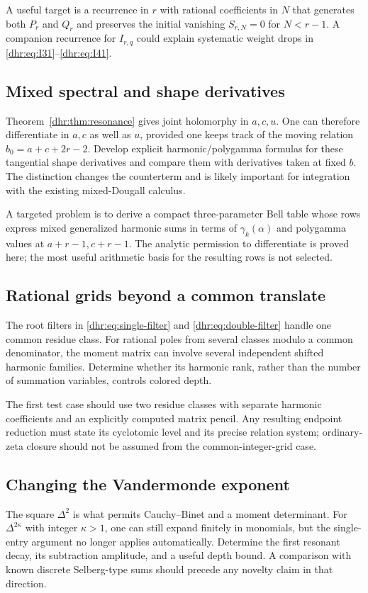 A useful target is a recurrence in $r$ with rational coefficients in
$N$ that generates both $P_r$ and $Q_r$ and preserves the initial
vanishing $S_{r,N}=0$ for $N<r-1$. A companion recurrence for
$I_{r,q}$ could explain systematic weight drops in
\eqref{dhr:eq:I31}--\eqref{dhr:eq:I41}.

\subsection{Mixed spectral and shape derivatives}
Theorem~\ref{dhr:thm:resonance} gives joint holomorphy in $a,c,u$.
One can therefore differentiate in $a,c$ as well as $u$, provided
one keeps track of the moving relation $b_0=a+c+2r-2$.
Develop explicit harmonic/polygamma formulas for these tangential
shape derivatives and compare them with derivatives taken at fixed
$b$. The distinction changes the counterterm and is likely important
for integration with the existing mixed-Dougall calculus.

A targeted problem is to derive a compact three-parameter Bell table
whose rows express mixed generalized harmonic sums in terms of
$\gamma_k(\alpha)$ and polygamma values at $a+r-1,c+r-1$.
The analytic permission to differentiate is proved here; the most
useful arithmetic basis for the resulting rows is not selected.

\subsection{Rational grids beyond a common translate}
The root filters in \eqref{dhr:eq:single-filter} and
\eqref{dhr:eq:double-filter} handle one common residue class.
For rational poles from several classes modulo a common denominator,
the moment matrix can involve several independent shifted harmonic
families. Determine whether its harmonic rank, rather than the number
of summation variables, controls colored depth.

The first test case should use two residue classes with separate
harmonic coefficients and an explicitly computed matrix pencil.
Any resulting endpoint reduction must state its cyclotomic level and
its precise relation system; ordinary-zeta closure should not be
assumed from the common-integer-grid case.

\subsection{Changing the Vandermonde exponent}
The square $\Delta^2$ is what permits Cauchy--Binet and a moment
determinant. For $\Delta^{2\kappa}$ with integer $\kappa>1$, one
can still expand finitely in monomials, but the single-entry argument
no longer applies automatically. Determine the first resonant decay,
its subtraction amplitude, and a useful depth bound. A comparison
with known discrete Selberg-type sums should precede any novelty
claim in that direction.


